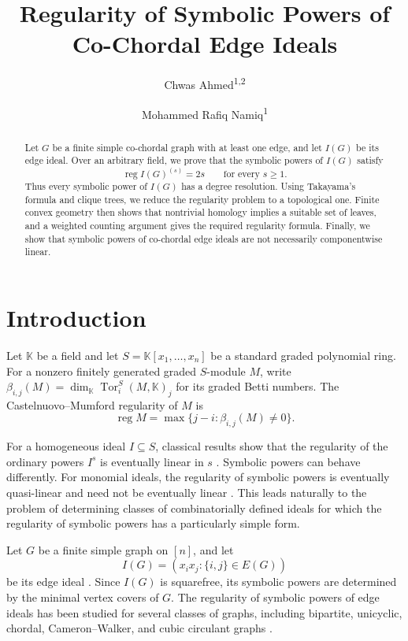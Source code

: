 \documentclass[11pt]{amsart}
\title{Regularity of Symbolic Powers of Co-Chordal Edge Ideals}
\author{Chwas Ahmed\textsuperscript{1,2}}
\author{Mohammed Rafiq Namiq\textsuperscript{1}}
\theoremstyle{definition}
\newcommand{\reg}{\operatorname{reg}}
\newcommand{\kk}{\mathbb K}
\begin{document}
\begin{abstract}
Let $G$ be a finite simple co-chordal graph with at least one edge, and let $I(G)$ be its edge ideal. Over an arbitrary field, we prove that the symbolic powers of $I(G)$ satisfy
\[
\reg I(G)^{(s)}=2s
\qquad\text{for every }s\ge1.
\]
Thus every symbolic power of $I(G)$ has a degree resolution. Using Takayama's formula and clique trees, we reduce the regularity problem to a topological one. Finite convex geometry then shows that nontrivial homology implies a suitable set of leaves, and a weighted counting argument gives the required regularity formula. Finally, we show that symbolic powers of co-chordal edge ideals are not necessarily componentwise linear.
\end{abstract}

\maketitle

\section{Introduction}

Let $\kk$ be a field and let $S=\kk[x_1,\ldots,x_n]$ be a standard graded polynomial ring. For a nonzero finitely generated graded $S$-module $M$, write $\beta_{i,j}(M)=\dim_\kk \operatorname{Tor}_i^S(M,\kk)_j$ for its graded Betti numbers. The Castelnuovo--Mumford regularity of $M$ is
\[
\reg M=\max\{j-i:\beta_{i,j}(M)\ne0\}.
\]

For a homogeneous ideal $I\subseteq S$, classical results show that the regularity of the ordinary powers $I^s$ is eventually linear in $s$ \cite{CutkoskyHerzogTrung,Kodiyalam}. Symbolic powers can behave differently. For monomial ideals, the regularity of symbolic powers is eventually quasi-linear and need not be eventually linear \cite{DungHienNguyenTrung,HerzogHibiTrung}. This leads naturally to the problem of determining classes of combinatorially defined ideals for which the regularity of symbolic powers has a particularly simple form.

Let $G$ be a finite simple graph on $[n]$, and let
\[
I(G)=(x_ix_j:\{i,j\}\in E(G))
\]
be its edge ideal \cite{villareal}. Since $I(G)$ is squarefree, its symbolic powers are determined by the minimal vertex covers of $G$. The regularity of symbolic powers of edge ideals has been studied for several classes of graphs, including bipartite, unicyclic, chordal, Cameron--Walker, and cubic circulant graphs \cite{FakhariCameronWalker,FakhariUnicyclic,FakhariChordal,HangPhamVu,SimisVasconcelosVillarreal}.
\end{document}
